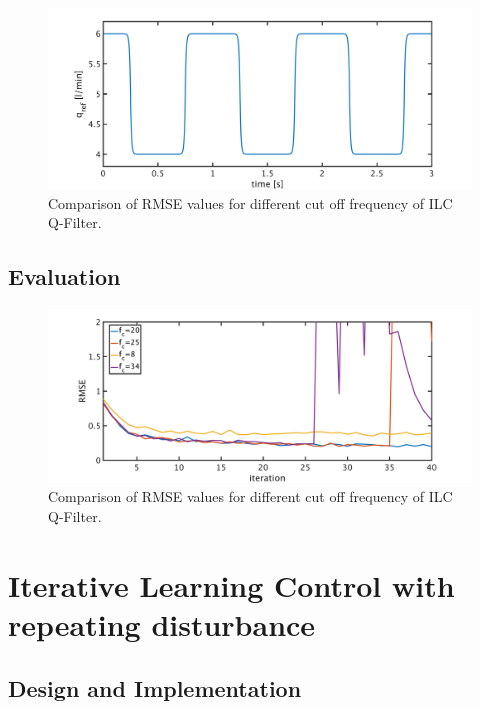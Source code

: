 \begin{figure}[ht]
  \centering
  \includegraphics[width=\textwidth]{images/chapt_5/ILC/ref_signal_ILC3.pdf}
  \caption[Comparison of RMSE values for different cut off frequency of ILC Q-Filter]{Comparison of RMSE values for different cut off frequency of ILC Q-Filter.}
  \label{fig:ref_signal_ILC3}
\end{figure}
\subsection{Evaluation}


\begin{figure}[ht]
  \centering
  \includegraphics[width=\textwidth]{images/chapt_5/ILC/RMSE_compare_ILC3_fc.pdf}
  \caption[Comparison of RMSE values for different cut off frequency of ILC Q-Filter]{Comparison of RMSE values for different cut off frequency of ILC Q-Filter.}
  \label{fig:RMSE_compare_ILC3_fc}
\end{figure}
\section{Iterative Learning Control with repeating disturbance}
\subsection{Design and Implementation}

